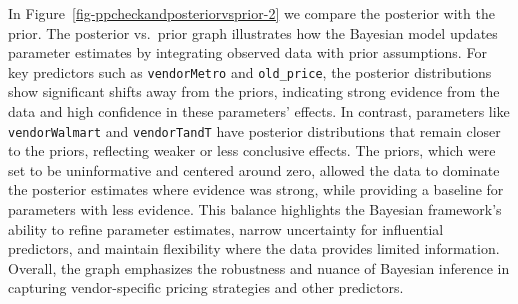 \documentclass[
  letterpaper,
  DIV=11,
  numbers=noendperiod]{scrartcl}
\begin{document}
In Figure~\ref{fig-ppcheckandposteriorvsprior-2} we compare the
posterior with the prior. The posterior vs.~prior graph illustrates how
the Bayesian model updates parameter estimates by integrating observed
data with prior assumptions. For key predictors such as
\texttt{vendorMetro} and \texttt{old\_price}, the posterior
distributions show significant shifts away from the priors, indicating
strong evidence from the data and high confidence in these parameters'
effects. In contrast, parameters like \texttt{vendorWalmart} and
\texttt{vendorTandT} have posterior distributions that remain closer to
the priors, reflecting weaker or less conclusive effects. The priors,
which were set to be uninformative and centered around zero, allowed the
data to dominate the posterior estimates where evidence was strong,
while providing a baseline for parameters with less evidence. This
balance highlights the Bayesian framework's ability to refine parameter
estimates, narrow uncertainty for influential predictors, and maintain
flexibility where the data provides limited information. Overall, the
graph emphasizes the robustness and nuance of Bayesian inference in
capturing vendor-specific pricing strategies and other predictors.
\end{document}
